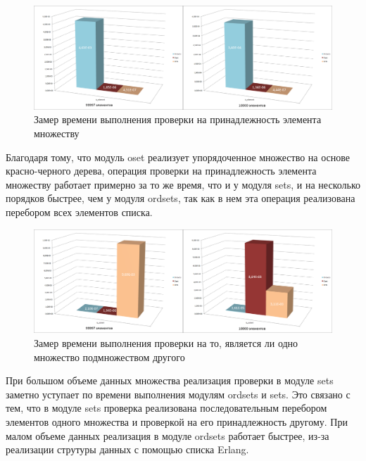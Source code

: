 		\begin{figure}[H]
				\centering
				\includegraphics[width=\textwidth]{img/histograms/is_element.png}
				\caption{Замер времени выполнения проверки на принадлежность элемента множеству}
		\end{figure}
		Благодаря тому, что модуль oset реализует упорядоченное множество на основе красно-черного дерева, операция
		проверки на принадлежность элемента множеству работает примерно за то же время, что и у модуля sets, и на 
		несколько порядков быстрее, чем у модуля ordsets, так как в нем эта операция реализована перебором всех элементов
		списка.  
		
		\begin{figure}[H]
				\centering
				\includegraphics[width=\textwidth]{img/histograms/is_subset.png}
				\caption{Замер времени выполнения проверки на то, является ли одно множество подмножеством другого}
		\end{figure}
		При большом объеме данных множества реализация проверки в модуле sets заметно уступает по времени 
		выполнения модулям ordsets и sets. Это связано с тем, что в модуле sets проверка реализована 
		последовательным перебором элементов одного множества и проверкой на его принадлежность другому. При малом 
		объеме данных реализация в модуле ordsets работает быстрее, из-за реализации струтуры данных с помощью 
		списка Erlang.  
		
